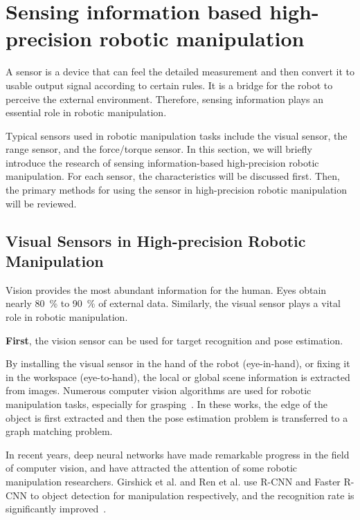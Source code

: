 \documentclass[journal,twoside,web]{ieeecolor}
\begin{document}
\section{Sensing information based high-precision robotic manipulation}
\label{sec:compliant_sensor}

A sensor is a device that can feel the detailed measurement and then convert it to usable output signal according to certain rules. It is a bridge for the robot to perceive the external environment. Therefore, sensing information plays an essential role in robotic manipulation.

Typical sensors used in robotic manipulation tasks include the visual sensor, the range sensor, and the force/torque sensor. In this section, we will briefly introduce the research of sensing information-based high-precision robotic manipulation. For each sensor, the characteristics will be discussed first. Then, the primary methods for using the sensor in high-precision robotic manipulation will be reviewed.

\subsection{Visual Sensors in High-precision Robotic Manipulation}
\label{subsec:visual_sensor}

Vision provides the most abundant information for the human. Eyes obtain nearly \SI{80}{\percent} to \SI{90}{\percent} of external data. Similarly, the visual sensor plays a vital role in robotic manipulation. 

\textbf{First}, the vision sensor can be used for target recognition and pose estimation. 

By installing the visual sensor in the hand of the robot (eye-in-hand), or fixing it in the workspace (eye-to-hand), the local or global scene information is extracted from images. 
Numerous computer vision algorithms are used for robotic manipulation tasks, especially for grasping~\cite{Morales2006,RecatalA2008,Speth2008,Su2009,Kobayashi2015,Ortenzi2018,Hu2019}. 
In these works, the edge of the object is first extracted and then the pose estimation problem is transferred to a graph matching problem.

In recent years, deep neural networks have made remarkable progress in the field of computer vision, and have attracted the attention of some robotic manipulation researchers. 
Girshick et al. and Ren et al. use R-CNN and Faster R-CNN to object detection for manipulation respectively, and the recognition rate is significantly improved~\cite{Girshick2014Rich,ren2017faster}. 
\end{document}
